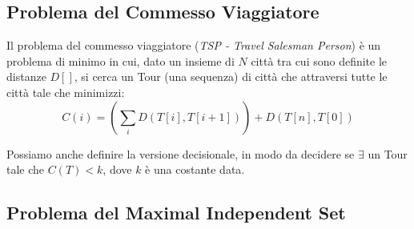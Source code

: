 \documentclass[a4paper,11pt]{book}
\begin{document}
\subsection{Problema del Commesso Viaggiatore}

Il problema del commesso viaggiatore (\emph{TSP - Travel Salesman Person}) \`e un problema di minimo in cui, dato un insieme di $N$ citt\`a tra cui sono definite le distanze $D[]$, si cerca un Tour (una sequenza) di citt\`a che attraversi tutte le citt\`a tale che minimizzi: $$C(i) = (\sum_{i} D(T[i], T[i+1])) + D(T[n], T[0])$$

Possiamo anche definire la versione decisionale, in modo da decidere se $\exists$ un Tour tale che $C(T) < k$, dove $k$ \`e una costante data.

\subsection{Problema del Maximal Independent Set}
\end{document}

